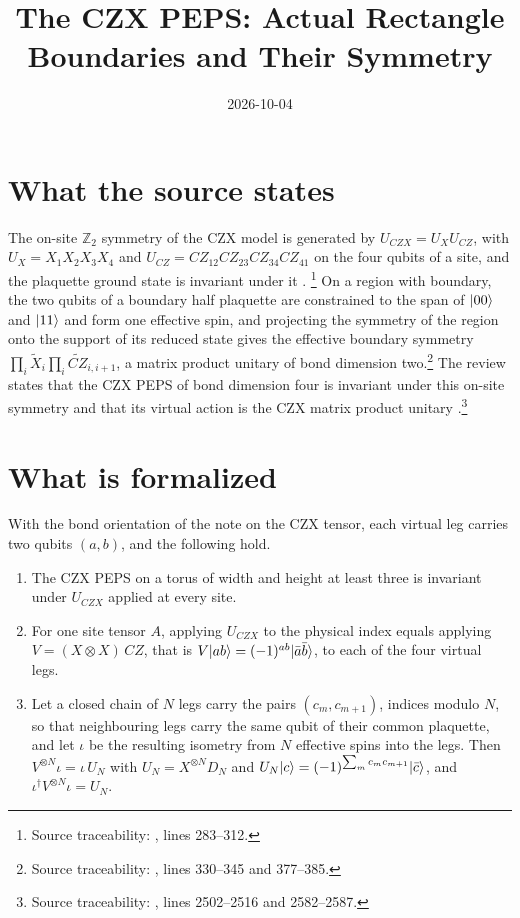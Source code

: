 \documentclass{article}
\title{The CZX PEPS: Actual Rectangle Boundaries and Their Symmetry}
\author{}
\date{2026-10-04}
\begin{document}
\maketitle
{}

\section{What the source states}
The on-site $\mathbb Z_2$ symmetry of the CZX model is generated by
$U_{CZX}=U_XU_{CZ}$, with $U_X=X_1X_2X_3X_4$ and
$U_{CZ}=CZ_{12}CZ_{23}CZ_{34}CZ_{41}$ on the four qubits of a site, and the
plaquette ground state is invariant under it \cite{ChenLiuWen2011CZX}.%
\footnote{Source traceability:
    , lines 283--312.}
On a region with boundary, the two qubits of a boundary half plaquette are
constrained to the span of $|00\rangle$ and $|11\rangle$ and form one effective
spin, and projecting the symmetry of the region onto the support of its
reduced state gives the effective boundary symmetry
$\prod_i\tilde X_i\prod_i\widetilde{CZ}_{i,i+1}$, a matrix product unitary of
bond dimension two.\footnote{Source traceability:
    , lines 330--345 and
    377--385.}
The review states that the CZX PEPS of bond dimension four is invariant under
this on-site symmetry and that its virtual action is the CZX matrix product
unitary \cite{Cirac2021Matrix}.\footnote{Source traceability:
    , lines 2502--2516 and
    2582--2587.}

\section{What is formalized}
With the bond orientation of the note on the CZX tensor, each virtual leg
carries two qubits $(a,b)$, and the following hold.
\begin{enumerate}
    \item The CZX PEPS on a torus of width and height at least three is
          invariant under $U_{CZX}$ applied at every site.
    \item For one site tensor $A$, applying $U_{CZX}$ to the physical index
          equals applying $V=(X\otimes X)\,CZ$, that is
          $V|ab\rangle=(-1)^{ab}|\bar a\bar b\rangle$, to each of the four
          virtual legs.
    \item Let a closed chain of $N$ legs carry the pairs
          $(c_m,c_{m+1})$, indices modulo $N$, so that neighbouring legs
          carry the same qubit of their common plaquette, and let $\iota$ be
          the resulting isometry from $N$ effective spins into the legs. Then
          $V^{\otimes N}\iota=\iota\,U_N$ with
          $U_N=X^{\otimes N}D_N$ and
          $U_N|c\rangle=(-1)^{\sum_mc_mc_{m+1}}|\bar c\rangle$, and
          $\iota^\dagger V^{\otimes N}\iota=U_N$.
\end{enumerate}
\end{document}
